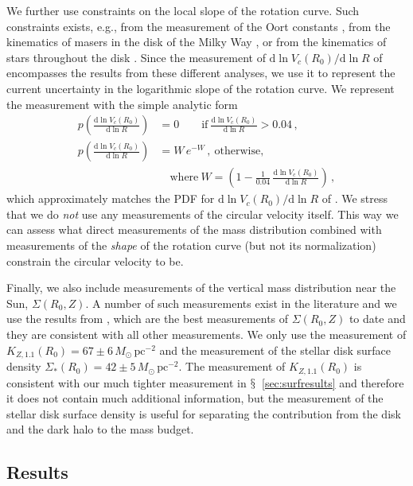 \documentclass{emulateapj}
\newcommand{\dd}{\mathrm{d}}
\newcommand{\eg}{e.g.}
\newcommand{\sectionname}{$\mathsection$}
\newcommand{\pc}{\ensuremath{\,\mathrm{pc}}}
\newcommand{\kzoneone}{\ensuremath{K_{Z,1.1}}}
\begin{document}
We further use constraints on the local slope of the rotation
curve. Such constraints exists, \eg, from the measurement of the Oort
constants \citep[\eg,][]{Feast97a}, from the kinematics of masers in
the disk of the Milky Way \citep{Reid09a,Bovy09b}, or from the
kinematics of stars throughout the disk \citep{BovyVc}. Since the
measurement of $\dd \ln V_c (R_0)/ \dd \ln R$ of \citet{BovyVc}
encompasses the results from these different analyses, we use it to
represent the current uncertainty in the logarithmic slope of the
rotation curve. We represent the \citet{BovyVc} measurement with the
simple analytic form
\begin{align}\label{eq:dlnvcdlnrprior}
  p\left(\frac{\dd \ln V_c(R_0)}{\dd \ln R} \right)& = 0\qquad
  \mathrm{if}\ \frac{\dd \ln V_c(R_0)}{\dd \ln R} > 0.04\,,\\ 
  p\left(\frac{\dd  \ln V_c(R_0)}{\dd \ln R} \right)& = W\,e^{-W}\,,\ \mathrm{otherwise},\nonumber\\
& \quad
  \mathrm{where}\ W = \left(1 - \frac{1}{0.04}\,\frac{\dd \ln V_c(R_0)}{\dd
    \ln R}\right)\,,\nonumber
\end{align}
which approximately matches the PDF for $\dd \ln V_c (R_0)/ \dd \ln R$
of \citet{BovyVc}. We stress that we do \emph{not} use any
measurements of the circular velocity itself. This way we can assess
what direct measurements of the mass distribution combined with
measurements of the \emph{shape} of the rotation curve (but not its
normalization) constrain the circular velocity to be.

Finally, we also include measurements of the vertical mass
distribution near the Sun, $\Sigma(R_0,Z)$. A number of such
measurements exist in the literature and we use the results from
\citet{Zhang13a}, which are the best measurements of $\Sigma(R_0,Z)$
to date and they are consistent with all other measurements. We only
use the measurement of $\kzoneone(R_0) = 67\pm6\,M_\odot\pc^{-2}$ and
the measurement of the stellar disk surface density $\Sigma_{*}(R_0) =
42\pm5\,M_\odot\pc^{-2}$. The measurement of $\kzoneone(R_0)$ is
consistent with our much tighter measurement in
\sectionname~\ref{sec:surfresults} and therefore it does not contain
much additional information, but the measurement of the stellar disk
surface density is useful for separating the contribution from the
disk and the dark halo to the mass budget.

\subsection{Results}\label{sec:fitresults}
\end{document}

